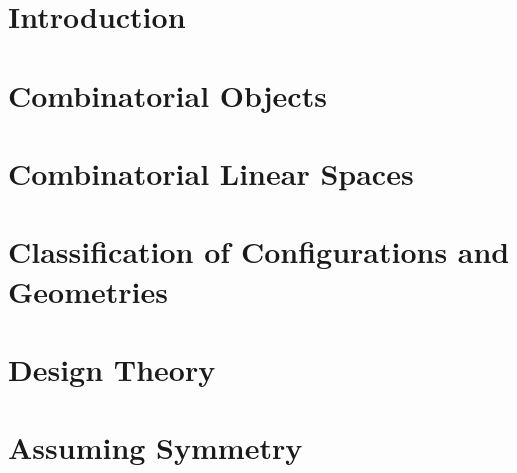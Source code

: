 \section{Introduction}
\label{sec:combinatorics:intro}




\bigskip


\clearpage


\section{Combinatorial Objects}
\label{sec:combo}




\bigskip


\clearpage


\section{Combinatorial Linear Spaces}
\label{sec:combinatorial:linear:spaces}




\bigskip


\clearpage


\section{Classification of Configurations and Geometries}
\label{sec:configurations}




\bigskip


\clearpage


\section{Design Theory}
\label{sec:design}









\bigskip
\clearpage


\section{Assuming Symmetry}
\label{sec:design:assuming:symmetry}









